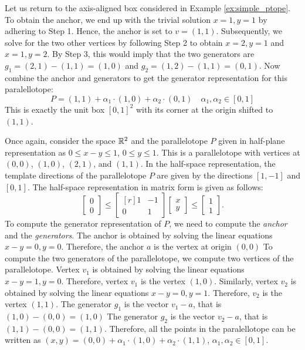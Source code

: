 \begin{example}
Let us return to the axis-aligned box considered in Example \ref{ex:simple_ptope}.
%
To obtain the anchor, we end up with the trivial solution $x = 1, y=1$ by adhering to Step 1. Hence, the anchor is set to $v = (1,1)$.
%
Subsequently, we solve for the two other vertices by following Step 2 to obtain $x=2, y= 1$ and $x=1,y=2$.
%
By Step 3, this would imply that the two generators are $g_1 = (2,1)-(1,1) = (1,0)$ and $g_2 = (1,2)-(1,1) = (0,1)$.
%
Now combine the anchor and generators to get the generator representation for this paralellotope:
%
\begin{equation}
 P = (1,1) + \alpha_1\cdot(1,0) + \alpha_2\cdot(0,1) \quad \alpha_1, \alpha_2 \in [0,1]
\end{equation}
%
This is exactly the unit box $[0,1]^2$ with its corner at the origin shifted to $(1,1)$.
\end{example}
%
\begin{example}
\label{ex:diag_ptope}
Once again, consider the space ${\mathbb{R}}^2$ and the parallelotope $P$ given in half-plane representation as $0 \leq x-y \leq 1$, $0 \leq y \leq 1$.
%
This is a parallelotope with vertices at $(0,0)$, $(1,0)$, $(2,1)$, and $(1,1)$.
%
In the half-space representation, the template directions of the parallelotope $P$ are given by the directions $[1, -1]$ and $[0, 1]$.
%
The half-space representation in matrix form is given as follows:
%
\begin{equation}
  \begin{bmatrix} 0 \\ 0 \end{bmatrix} \leq \begin{bmatrix*}[r]  1 & -1 \\ 0 &  1 \end{bmatrix*}  \begin{bmatrix} x \\ y \end{bmatrix} \leq \begin{bmatrix} 1 \\ 1 \end{bmatrix}. \label{eq:ptopeexample}
\end{equation}
%
To compute the generator representation of $P$, we need to compute the \emph{anchor} and the \emph{generators}.
%
The anchor is obtained by solving the linear equations $x-y = 0, y = 0$.
%
Therefore, the anchor $a$ is the vertex at origin $(0,0)$
%
To compute the two generators of the parallelotope, we compute two vertices of the parallelotope.
%
Vertex $v_1$ is obtained by solving the linear equations $x - y = 1, y = 0$.
%
Therefore, vertex $v_1$ is the vertex $(1,0)$.
%
Similarly, vertex $v_2$ is obtained by solving the linear equations $x-y = 0, y = 1$.
%
Therefore, $v_2$ is the vertex $(1,1)$.
%
The generator $g_1$ is the vector $v_1 - a$, that is $(1,0)- (0,0) = (1,0)$
%
The generator $g_2$ is the vector $v_2 - a$, that is $(1,1) - (0,0) = (1,1)$.
%
Therefore, all the points in the paralellotope can be written as $(x,y) = (0,0) + \alpha_1 \cdot (1,0) + \alpha_2\cdot (1,1)$, $\alpha_1, \alpha_2 \in [0,1]$.
\end{example}
